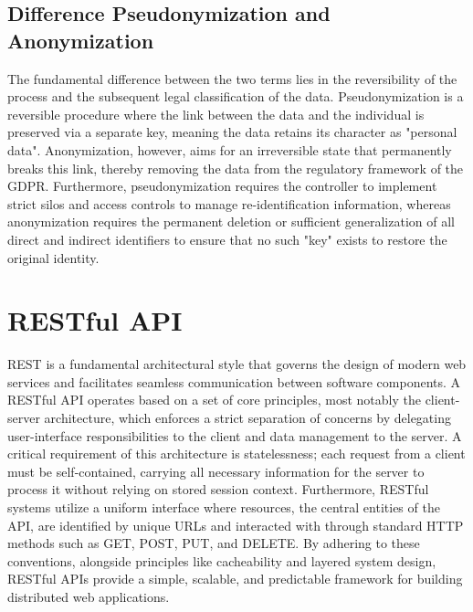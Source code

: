 \subsection{Difference Pseudonymization and Anonymization}

The fundamental difference between the two terms lies in the reversibility of the process and the subsequent legal classification of the data. Pseudonymization is a reversible procedure where the link between the data and the individual is preserved via a separate key, meaning the data retains its character as "personal data". Anonymization, however, aims for an irreversible state that permanently breaks this link, thereby removing the data from the regulatory framework of the \ac{GDPR}. Furthermore, pseudonymization requires the controller to implement strict silos and access controls to manage re-identification information, whereas anonymization requires the permanent deletion or sufficient generalization of all direct and indirect identifiers to ensure that no such "key" exists to restore the original identity.
\autocite[8, 13, 31, 68]{gmdsbvd2024praxishilfe}
\autocite[3, 19]{schwartmann2022praxisleitfaden}

\section{RESTful API}
\ac{REST} is a fundamental architectural style that governs the design of modern web services and facilitates seamless communication between software components. A RESTful \ac{API} operates based on a set of core principles, most notably the client-server architecture, which enforces a strict separation of concerns by delegating user-interface responsibilities to the client and data management to the server. A critical requirement of this architecture is statelessness; each request from a client must be self-contained, carrying all necessary information for the server to process it without relying on stored session context. Furthermore, RESTful systems utilize a uniform interface where resources, the central entities of the \ac{API}, are identified by unique \acp{URL} and interacted with through standard \ac{HTTP} methods such as GET, POST, PUT, and DELETE. By adhering to these conventions, alongside principles like cacheability and layered system design, RESTful \acp{API} provide a simple, scalable, and predictable framework for building distributed web applications.
\autocite[1--14]{selvaraj2024mastering}
